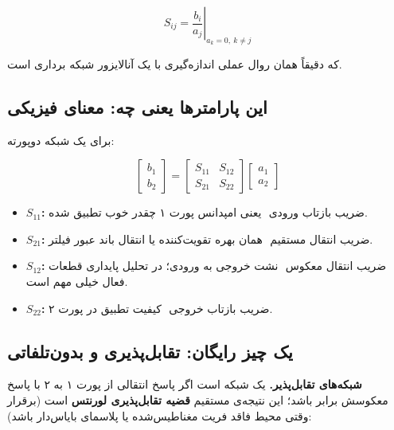 \documentclass[12pt]{article}
\begin{document}
	\begin{equation}
		S_{ij} = \left.\frac{b_i}{a_j}\right|_{a_k=0,\ k\neq j}
	\end{equation}
	
	که دقیقاً همان روال عملی اندازه‌گیری با یک آنالایزور شبکه برداری  است.
	
	\subsection{این پارامترها یعنی چه: معنای فیزیکی \texorpdfstring{}{S-Parameters}}
	
	برای یک شبکه دوپورته:
	
	\begin{equation}
		\begin{bmatrix} b_1 \\ b_2 \end{bmatrix} = \begin{bmatrix} S_{11} & S_{12} \\ S_{21} & S_{22} \end{bmatrix}\begin{bmatrix} a_1 \\ a_2 \end{bmatrix}
	\end{equation}
	
	\begin{itemize}
		\item \textbf{$S_{11}$:} ضریب بازتاب ورودی ‌ یعنی امپدانس پورت ۱ چقدر خوب تطبیق شده.
		\item \textbf{$S_{21}$:} ضریب انتقال مستقیم ‌ همان بهره تقویت‌کننده یا انتقال باند عبور فیلتر.
		\item \textbf{$S_{12}$:} ضریب انتقال معکوس ‌ نشت خروجی به ورودی؛ در تحلیل پایداری قطعات فعال خیلی مهم است.
		\item \textbf{$S_{22}$:} ضریب بازتاب خروجی ‌ کیفیت تطبیق در پورت ۲.
	\end{itemize}
	
	\subsection{یک چیز رایگان: تقابل‌پذیری و بدون‌تلفاتی}
	
	\textbf{شبکه‌های تقابل‌پذیر.} یک شبکه  است اگر پاسخ انتقالی از پورت ۱ به ۲ با پاسخ معکوسش برابر باشد؛ این نتیجه‌ی مستقیم \textbf{قضیه تقابل‌پذیری لورنتس} است (برقرار وقتی محیط فاقد فریت مغناطیس‌شده یا پلاسمای بایاس‌دار باشد):
	
\end{document}

